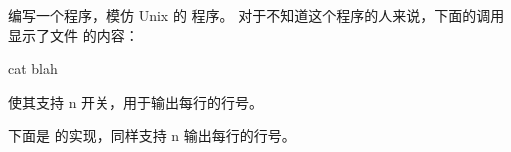 \begin{Exercise}[title={Cat},difficulty=1]
\label{ex:cat}
\Question \label{ex:cat q1} 编写一个程序，模仿 Unix 的  程序。
对于不知道这个程序的人来说，下面的调用显示了文件  的内容：
\begin{display}
\pr cat blah
\end{display}

\Question 使其支持 \-n 开关，用于输出每行的行号。

\end{Exercise}

\begin{Answer}
\Question 下面是  的实现，同样支持 \-n 输出每行的行号。

\showremarks
\end{Answer}
